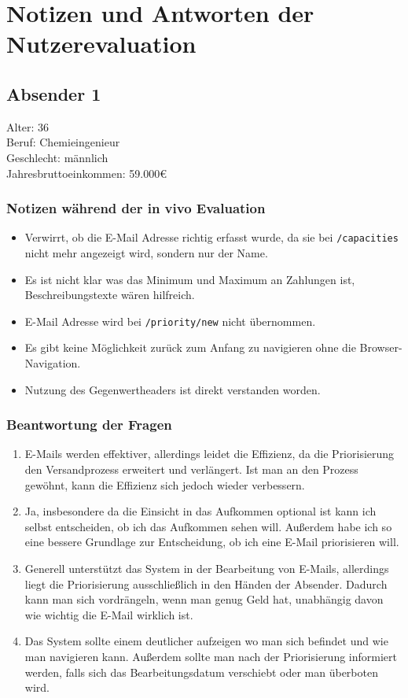 \newpage
\section{Notizen und Antworten der Nutzerevaluation}
\label{Notizen_und_Antworten_der_Nutzerevaluation}

\subsection{Absender 1}
Alter: 36 \\
Beruf: Chemieingenieur \\
Geschlecht: männlich \\
Jahresbruttoeinkommen: 59.000€

\subsubsection*{Notizen während der in vivo Evaluation}
\begin{itemize}
    \item Verwirrt, ob die E-Mail Adresse richtig erfasst wurde, da sie bei \texttt{/capacities} nicht mehr angezeigt wird, sondern nur der Name.
    \item Es ist nicht klar was das Minimum und Maximum an Zahlungen ist, Beschreibungstexte wären hilfreich.
    \item E-Mail Adresse wird bei \texttt{/priority/new} nicht übernommen.
    \item Es gibt keine Möglichkeit zurück zum Anfang zu navigieren ohne die Browser-Navigation.
    \item Nutzung des Gegenwertheaders ist direkt verstanden worden.
\end{itemize}

\subsubsection*{Beantwortung der Fragen}
\begin{enumerate}
\item E-Mails werden effektiver, allerdings leidet die Effizienz, da die Priorisierung den Versandprozess erweitert und verlängert. Ist man an den Prozess gewöhnt, kann die Effizienz sich jedoch wieder verbessern.
\item Ja, insbesondere da die Einsicht in das Aufkommen optional ist kann ich selbst entscheiden, ob ich das Aufkommen sehen will. Außerdem habe ich so eine bessere Grundlage zur Entscheidung, ob ich eine E-Mail priorisieren will.
\setcounter{enumi}{4}
\item Generell unterstützt das System in der Bearbeitung von E-Mails, allerdings liegt die Priorisierung ausschließlich in den Händen der Absender. Dadurch kann man sich vordrängeln, wenn man genug Geld hat, unabhängig davon wie wichtig die E-Mail wirklich ist.
\item Das System sollte einem deutlicher aufzeigen wo man sich befindet und wie man navigieren kann. Außerdem sollte man nach der Priorisierung informiert werden, falls sich das Bearbeitungsdatum verschiebt oder man überboten wird.
\end{enumerate}

